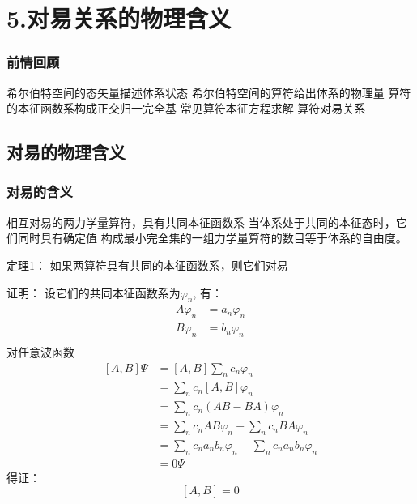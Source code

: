 
\section{5.对易关系的物理含义}

\begin{frame}
    \frametitle{前情回顾}
    \begin{itemize}
        \Item 希尔伯特空间的态矢量描述体系状态
        \Item 希尔伯特空间的算符给出体系的物理量
        \Item 算符的本征函数系构成正交归一完全基
        \Item 常见算符本征方程求解
        \Item 算符对易关系
    \end{itemize}   
\end{frame} 

\subsection{对易的物理含义}

\begin{frame} 
    \frametitle{对易的含义}
    \begin{enumerate}
        \Item  相互对易的两力学量算符，具有共同本征函数系
        \Item  当体系处于共同的本征态时，它们同时具有确定值
        \Item  构成最小完全集的一组力学量算符的数目等于体系的自由度。
    \end{enumerate}
\end{frame} 

\begin{frame} [allowframebreaks=]
    \begin{tcolorbox1}{定理1：}
        如果两算符具有共同的本征函数系，则它们对易
    \end{tcolorbox1}
    \alert{证明：} 设它们的共同本征函数系为{$\varphi_n$}, 有：\\ 
        \begin{equation*}
            \begin{split} 
            A\varphi_n&=a_n \varphi_n \\
            B\varphi_n&=b_n \varphi_n \\
            \end{split}  
        \end{equation*}  
        对任意波函数
        \begin{equation*}
            \begin{split} 
            [A,B]\Psi &= [A,B]\sum_n c_n \varphi_n \\
            &= \sum_n c_n [A,B]\varphi_n \\
            &= \sum_n c_n (AB-BA)\varphi_n\\
            &= \sum_n c_n AB\varphi_n- \sum_n c_n BA\varphi_n\\
            &= \sum_n c_n a_nb_n\varphi_n- \sum_n c_n a_nb_n\varphi_n\\
            &=0\Psi
            \end{split}  
        \end{equation*}  
        得证： $$[A,B]=0$$
\end{frame} 

